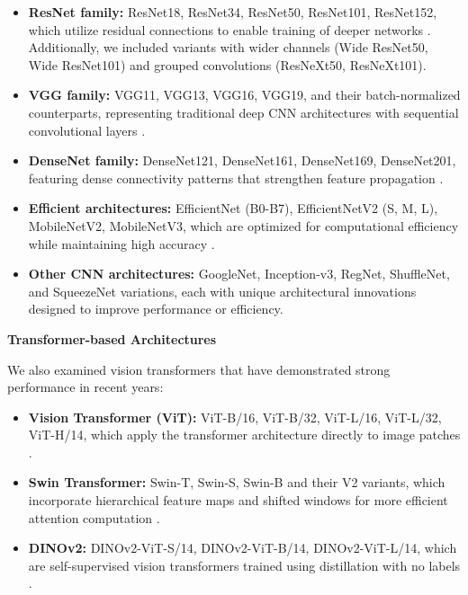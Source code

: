 \documentclass[12pt,a4paper,oneside]{report}
\begin{document}
\begin{itemize}
    \item \textbf{ResNet family:} ResNet18, ResNet34, ResNet50, ResNet101, ResNet152, which utilize residual connections to enable training of deeper networks \cite{heDeepResidualLearning2015}. Additionally, we included variants with wider channels (Wide ResNet50, Wide ResNet101) and grouped convolutions (ResNeXt50, ResNeXt101).
    
    \item \textbf{VGG family:} VGG11, VGG13, VGG16, VGG19, and their batch-normalized counterparts, representing traditional deep CNN architectures with sequential convolutional layers \cite{simonyanVeryDeepConvolutional2015}.
    
    \item \textbf{DenseNet family:} DenseNet121, DenseNet161, DenseNet169, DenseNet201, featuring dense connectivity patterns that strengthen feature propagation \cite{huangDenselyConnectedConvolutional2017}.
    
    \item \textbf{Efficient architectures:} EfficientNet (B0-B7), EfficientNetV2 (S, M, L), MobileNetV2, MobileNetV3, which are optimized for computational efficiency while maintaining high accuracy \cite{tanEfficientNetRethinkingModel2020}.
    
    \item \textbf{Other CNN architectures:} GoogleNet, Inception-v3, RegNet, ShuffleNet, and SqueezeNet variations, each with unique architectural innovations designed to improve performance or efficiency.
\end{itemize}

\textbf{Transformer-based Architectures}

We also examined vision transformers that have demonstrated strong performance in recent years:

\begin{itemize}
    \item \textbf{Vision Transformer (ViT):} ViT-B/16, ViT-B/32, ViT-L/16, ViT-L/32, ViT-H/14, which apply the transformer architecture directly to image patches \cite{dosovitskiyImageWorth16x162021}.
    
    \item \textbf{Swin Transformer:} Swin-T, Swin-S, Swin-B and their V2 variants, which incorporate hierarchical feature maps and shifted windows for more efficient attention computation \cite{liuSwinTransformerHierarchical2021}.
    
    \item \textbf{DINOv2:} DINOv2-ViT-S/14, DINOv2-ViT-B/14, DINOv2-ViT-L/14, which are self-supervised vision transformers trained using distillation with no labels \cite{oquabDINOv2LearningRobust2024}.
\end{itemize}
\end{document}

